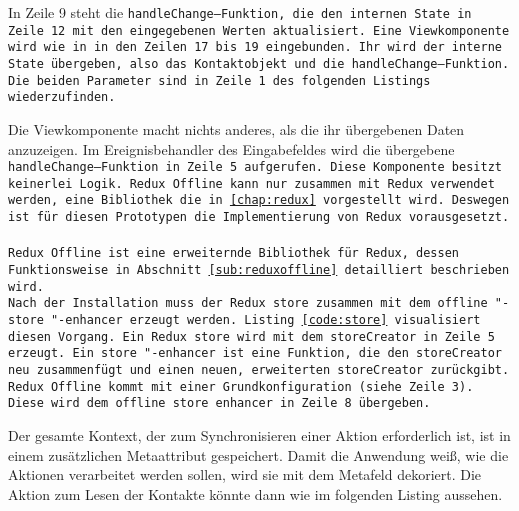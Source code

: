 In Zeile 9 steht die \tt{handleChange}--Funktion, die den internen State in Zeile 12 mit den eingegebenen Werten aktualisiert.
Eine Viewkomponente wird wie in in den Zeilen 17 bis 19 eingebunden. Ihr wird der interne State übergeben, also das Kontaktobjekt und die \tt{handleChange}--Funktion. 
Die beiden Parameter sind in Zeile 1 des folgenden Listings wiederzufinden.
\begin{center}
  
\end{center}
%
Die Viewkomponente macht nichts anderes, als die ihr übergebenen Daten anzuzeigen.
Im Ereignisbehandler des Eingabefeldes wird die übergebene \tt{handleChange}--Funktion in Zeile 5 aufgerufen.
Diese Komponente besitzt keinerlei Logik.
%
%
Redux Offline kann nur zusammen mit Redux verwendet werden, eine Bibliothek die in \autoref{chap:redux} vorgestellt wird.
Deswegen ist für diesen Prototypen die Implementierung von Redux vorausgesetzt.\\\\
%
Redux Offline ist eine erweiternde Bibliothek für Redux, dessen Funktionsweise in Abschnitt \ref{sub:reduxoffline} detailliert beschrieben wird.\\
Nach der Installation muss der Redux \tt{store} zusammen mit dem \tt{offline "-store "-enhancer} erzeugt werden. Listing \ref{code:store} visualisiert diesen Vorgang. Ein Redux \tt{store} wird mit dem \tt{storeCreator} in Zeile 5 erzeugt. Ein \tt{store "-enhancer} ist eine Funktion, die den \tt{storeCreator} neu zusammenfügt und einen neuen, erweiterten \tt{storeCreator} zurückgibt.
Redux Offline kommt mit einer Grundkonfiguration (siehe Zeile 3). Diese wird dem \tt{offline store enhancer} in Zeile 8 übergeben.
%
\begin{center}
  
\end{center}
%
Der gesamte Kontext, der zum Synchronisieren einer Aktion erforderlich ist, ist in einem zusätzlichen Metaattribut gespeichert.
Damit die Anwendung weiß, wie die Aktionen verarbeitet werden sollen, wird sie mit dem Metafeld dekoriert.
Die Aktion zum Lesen der Kontakte könnte dann wie im folgenden Listing aussehen.
